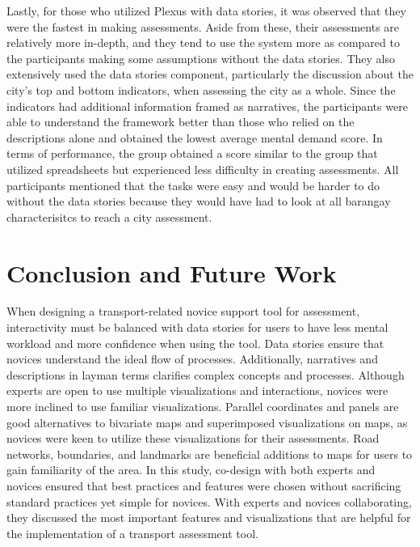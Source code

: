 \documentclass{sigchi}
\begin{document}
Lastly, for those who utilized Plexus with data stories, it was observed that they were the fastest in making assessments. Aside from these, their assessments are relatively more in-depth, and they tend to use the system more as compared to the participants making some assumptions without the data stories. They also extensively used the data stories component, particularly the discussion about the city's top and bottom indicators, when assessing the city as a whole. Since the indicators had additional information framed as narratives, the participants were able to understand the framework better than those who relied on the descriptions alone and obtained the lowest average mental demand score. In terms of performance, the group obtained a score similar to the group that utilized spreadsheets but experienced less difficulty in creating assessments. All participants mentioned that the tasks were easy and would be harder to do without the data stories because they would have had to look at all barangay characterisitcs to reach a city assessment. 


\section{Conclusion and Future Work}
When designing a transport-related novice support tool for assessment, interactivity must be balanced with data stories for users to have less mental workload and more confidence when using the tool. Data stories ensure that novices understand the ideal flow of processes. Additionally, narratives and descriptions in layman terms clarifies complex concepts and processes. Although experts are open to use multiple visualizations and interactions, novices were more inclined to use familiar visualizations. Parallel coordinates and panels are good alternatives to bivariate maps and superimposed visualizations on maps, as novices were keen to utilize these visualizations for their assessments. Road networks, boundaries, and landmarks are beneficial additions to maps for users to gain familiarity of the area.  In this study, co-design with both experts and novices ensured that best practices and features were chosen without sacrificing standard practices yet simple for novices. With experts and novices collaborating, they discussed the most important features and visualizations that are helpful for the implementation of a transport assessment tool. 

\end{document}
